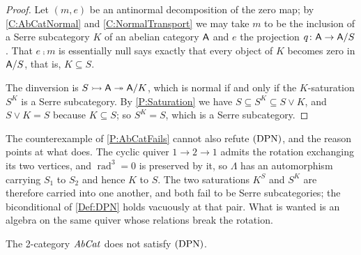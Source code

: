 \begin{proof}
  Let \((m,e)\) be an antinormal decomposition of the zero map; by \corx\ref{C:AbCatNormal} and \corx\ref{C:NormalTransport} we may take \(m\) to be the inclusion of a Serre subcategory \(K\) of an abelian category \(\mathsf{A}\) and \(e\) the projection \(q\colon\mathsf{A}\to\mathsf{A}/S\). That \(e\comp m\) is essentially null says exactly that every object of \(K\) becomes zero in \(\mathsf{A}/S\), that is, \(K\subseteq S\).

	The dinversion is \(S\rightarrowtail\mathsf{A}\twoheadrightarrow\mathsf{A}/K\), which is normal if and only if the \(K\)-saturation \(S^{K}\) is a Serre subcategory. By \prox\ref{P:Saturation} we have \(S\subseteq S^{K}\subseteq S\vee K\), and \(S\vee K=S\) because \(K\subseteq S\); so \(S^{K}=S\), which is a Serre subcategory.
\end{proof}

\begin{remark}
  \label{Rem NSD Symmetric}
  The counterexample of \prox\ref{P:AbCatFails} cannot also refute \(\textup{(DPN)}\), and the reason points at what does. The cyclic quiver \(1\to2\to1\) admits the rotation exchanging its two vertices, and \(\operatorname{rad}^{3}=0\) is preserved by it, so \(\Lambda\) has an automorphism carrying \(S_{1}\) to \(S_{2}\) and hence \(K\) to \(S\). The two saturations \(K^{S}\) and \(S^{K}\) are therefore carried into one another, and both fail to be Serre subcategories; the biconditional of \ref{Def:DPN} holds vacuously at that pair. What is wanted is an algebra on the same quiver whose relations break the rotation.
\end{remark}

\begin{proposition}
  \label{P:AbCatNotDPN} 
  The 2-category \(\mathit{AbCat}\) does not satisfy \(\textup{(DPN)}\).
\end{proposition}

